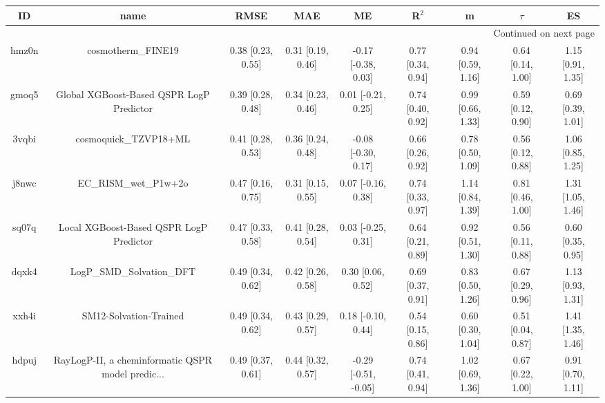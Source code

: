 \documentclass{article}
\begin{document}
\begin{center}
\scriptsize
\begin{longtable}{|ccccccccc|}
\toprule
    ID &                                               name &               RMSE &                MAE &                    ME &              R$^2$ &                    m &               $\tau$ &                    ES \\
\midrule
\endhead
\midrule
\multicolumn{9}{r}{{Continued on next page}} \\
\midrule
\endfoot

\bottomrule
\endlastfoot
 hmz0n &                                 cosmotherm\_FINE19 &  0.38 [0.23, 0.55] &  0.31 [0.19, 0.46] &   -0.17 [-0.38, 0.03] &  0.77 [0.34, 0.94] &    0.94 [0.59, 1.16] &    0.64 [0.14, 1.00] &     1.15 [0.91, 1.35] \\
 gmoq5 &           Global XGBoost-Based QSPR LogP Predictor &  0.39 [0.28, 0.48] &  0.34 [0.23, 0.46] &    0.01 [-0.21, 0.25] &  0.74 [0.40, 0.92] &    0.99 [0.66, 1.33] &    0.59 [0.12, 0.90] &     0.69 [0.39, 1.01] \\
 3vqbi &                              cosmoquick\_TZVP18+ML &  0.41 [0.28, 0.53] &  0.36 [0.24, 0.48] &   -0.08 [-0.30, 0.17] &  0.66 [0.26, 0.92] &    0.78 [0.50, 1.09] &    0.56 [0.12, 0.88] &     1.06 [0.85, 1.25] \\
 j8nwc &                              EC\_RISM\_wet\_P1w+2o &  0.47 [0.16, 0.75] &  0.31 [0.15, 0.55] &    0.07 [-0.16, 0.38] &  0.74 [0.33, 0.97] &    1.14 [0.84, 1.39] &    0.81 [0.46, 1.00] &     1.31 [1.05, 1.46] \\
 sq07q &            Local XGBoost-Based QSPR LogP Predictor &  0.47 [0.33, 0.58] &  0.41 [0.28, 0.54] &    0.03 [-0.25, 0.31] &  0.64 [0.21, 0.89] &    0.92 [0.51, 1.30] &    0.56 [0.11, 0.88] &     0.60 [0.35, 0.95] \\
 dqxk4 &                          LogP\_SMD\_Solvation\_DFT &  0.49 [0.34, 0.62] &  0.42 [0.26, 0.58] &     0.30 [0.06, 0.52] &  0.69 [0.37, 0.91] &    0.83 [0.50, 1.26] &    0.67 [0.29, 0.96] &     1.13 [0.93, 1.31] \\
 xxh4i &                             SM12-Solvation-Trained &  0.49 [0.34, 0.62] &  0.43 [0.29, 0.57] &    0.18 [-0.10, 0.44] &  0.54 [0.15, 0.86] &    0.60 [0.30, 1.04] &    0.51 [0.04, 0.87] &     1.41 [1.35, 1.46] \\
 hdpuj &  RayLogP-II, a cheminformatic QSPR model predic... &  0.49 [0.37, 0.61] &  0.44 [0.32, 0.57] &  -0.29 [-0.51, -0.05] &  0.74 [0.41, 0.94] &    1.02 [0.69, 1.36] &    0.67 [0.22, 1.00] &     0.91 [0.70, 1.11] \\

\end{longtable}
\end{center}
\end{document}
